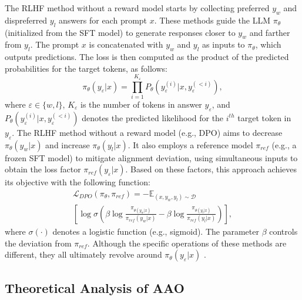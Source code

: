 The RLHF method without a reward model starts by collecting preferred $y_w$ and dispreferred $y_l$ answers for each prompt $x$. These methods guide the LLM $\pi_{\theta}$ (initialized from the SFT model) to generate responses closer to $y_w$ and farther from $y_l$. The prompt $x$ is concatenated with $y_w$ and $y_l$ as inputs to $\pi_{\theta}$, which outputs predictions. The loss is then computed as the product of the predicted probabilities for the target tokens, as follows:
\begin{equation}
    \pi_{\theta}(y_\varepsilon |x) =\prod_{i=1}^{K_\varepsilon }  P_{\theta }(y_\varepsilon ^{(i)}|x,y_\varepsilon ^{(<i)}),
    \label{eq:pi_theta}
\end{equation}
\noindent where $\varepsilon \in \{w,l\}$, $K_{\varepsilon}$ is the number of tokens in answer $y_{\varepsilon}$, and $P_{\theta}(y_\varepsilon^{(i)}|x,y_\varepsilon^{(<i)})$ denotes the predicted likelihood for the $i^{th}$ target token in $y_\varepsilon$. The RLHF method without a reward model (e.g., DPO) aims to decrease $\pi_\theta(y_w|x)$ and increase $\pi_\theta(y_l|x)$. It also employs a reference model $\pi_{ref}$ (e.g., a frozen SFT model) to mitigate alignment deviation, using simultaneous inputs to obtain the loss factor $\pi_{ref}(y_\varepsilon|x)$. Based on these factors, this approach achieves its objective with the following function:
\begin{equation}
\begin{split}
    \mathcal{L}_{DPO}(\pi_{\theta},\pi_{ref}) = -\mathbb{E}_{(x,y_w,y_l)\sim \mathcal{D} } \\ 
    \left [ \log\sigma(\beta \log \frac{\pi_{\theta(y_w|x)}}{\pi_{ref}(y_w|x)} - \beta \log \frac{\pi_{\theta(y_l|x)}}{\pi_{ref}(y_l|x)})\right ],
\end{split}
    \label{eq:dpo_loss}
\end{equation}
\noindent where $\sigma(\cdot)$ denotes a logistic function (e.g., sigmoid). The parameter $\beta$ controls the deviation from $\pi_{ref}$. Although the specific operations of these methods are different, they all ultimately revolve around $\pi_{\theta}(y_\varepsilon|x)$ \cite{ethayarajh2024kto,azar2024general}.


\subsection{Theoretical Analysis of AAO}
\label{subsec:motivation}

